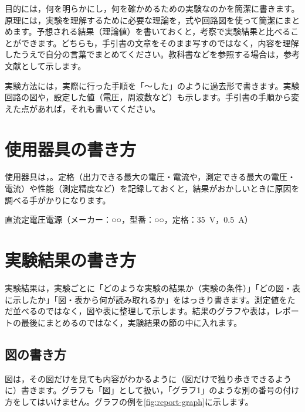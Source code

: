 目的には，何を明らかにし，何を確かめるための実験なのかを簡潔に書きます。原理には，実験を理解するために必要な理論を，式や回路図を使って簡潔にまとめます。予想される結果（理論値）を書いておくと，考察で実験結果と比べることができます。どちらも，手引書の文章をそのまま写すのではなく，内容を理解したうえで自分の言葉でまとめてください。教科書などを参照する場合は，参考文献として示します。

実験方法には，実際に行った手順を「〜した」のように過去形で書きます。実験回路の図や，設定した値（電圧，周波数など）も示します。手引書の手順から変えた点があれば，それも書いてください。

\section{使用器具の書き方}

使用器具は，。定格（出力できる最大の電圧・電流や，測定できる最大の電圧・電流）や性能（測定精度など）を記録しておくと，結果がおかしいときに原因を調べる手がかりになります。

\begin{hosoku}[例：使用器具の書き方]
直流定電圧電源（メーカー：○○，型番：○○，定格：\SI{35}{V}，\SI{0.5}{A}）
\end{hosoku}

\section{実験結果の書き方}

実験結果は，実験ごとに「どのような実験の結果か（実験の条件）」「どの図・表に示したか」「図・表から何が読み取れるか」をはっきり書きます。測定値をただ並べるのではなく，図や表に整理して示します。結果のグラフや表は，レポートの最後にまとめるのではなく，実験結果の節の中に入れます。

\subsection{図の書き方}

図は，その図だけを見ても内容がわかるように（図だけで独り歩きできるように）書きます。グラフも「図」として扱い，「グラフ1」のような別の番号の付け方をしてはいけません。グラフの例を\cref{fig:report-graph}に示します。

